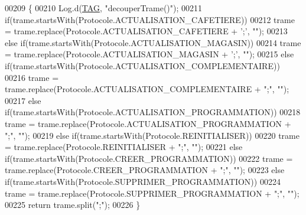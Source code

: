 \begin{DoxyCode}
00209     \{
00210         Log.d(\hyperlink{classcom_1_1example_1_1ekawa_1_1_protocole_ae9b68fa0daac528421b887f19413f8f5}{TAG}, \textcolor{stringliteral}{"decouperTrame()"});
00211         \textcolor{keywordflow}{if}(trame.startsWith(Protocole.ACTUALISATION\_CAFETIERE))
00212             trame = trame.replace(Protocole.ACTUALISATION\_CAFETIERE + \textcolor{charliteral}{';'}, \textcolor{stringliteral}{""});
00213         \textcolor{keywordflow}{else} \textcolor{keywordflow}{if}(trame.startsWith(Protocole.ACTUALISATION\_MAGASIN))
00214             trame = trame.replace(Protocole.ACTUALISATION\_MAGASIN + \textcolor{charliteral}{';'}, \textcolor{stringliteral}{""});
00215         \textcolor{keywordflow}{else} \textcolor{keywordflow}{if}(trame.startsWith(Protocole.ACTUALISATION\_COMPLEMENTAIRE))
00216             trame = trame.replace(Protocole.ACTUALISATION\_COMPLEMENTAIRE + \textcolor{stringliteral}{";"}, \textcolor{stringliteral}{""});
00217         \textcolor{keywordflow}{else} \textcolor{keywordflow}{if}(trame.startsWith(Protocole.ACTUALISATION\_PROGRAMMATION))
00218             trame = trame.replace(Protocole.ACTUALISATION\_PROGRAMMATION + \textcolor{stringliteral}{";"}, \textcolor{stringliteral}{""});
00219         \textcolor{keywordflow}{else} \textcolor{keywordflow}{if}(trame.startsWith(Protocole.REINITIALISER))
00220             trame = trame.replace(Protocole.REINITIALISER + \textcolor{stringliteral}{";"}, \textcolor{stringliteral}{""});
00221         \textcolor{keywordflow}{else} \textcolor{keywordflow}{if}(trame.startsWith(Protocole.CREER\_PROGRAMMATION))
00222             trame = trame.replace(Protocole.CREER\_PROGRAMMATION + \textcolor{stringliteral}{";"}, \textcolor{stringliteral}{""});
00223         \textcolor{keywordflow}{else} \textcolor{keywordflow}{if}(trame.startsWith(Protocole.SUPPRIMER\_PROGRAMMATION))
00224             trame = trame.replace(Protocole.SUPPRIMER\_PROGRAMMATION + \textcolor{stringliteral}{";"}, \textcolor{stringliteral}{""});
00225         \textcolor{keywordflow}{return} trame.split(\textcolor{stringliteral}{";"});
00226     \}
\end{DoxyCode}
\mbox{\label{classcom_1_1example_1_1ekawa_1_1_protocole_a3d092fccea3a5bf3a92810dbe90603b0}} 
